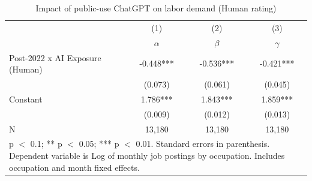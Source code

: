 \begin{table}[h]\centering
\def\sym#1{\ifmmode^{#1}\else\(^{#1}\)\fi}
\caption{Impact of public-use ChatGPT on labor demand (Human rating) \label{tab:did_postings_human}}
\begin{tabular}{l*{3}{c}}
\hline\hline
                    &\multicolumn{1}{c}{(1)}&\multicolumn{1}{c}{(2)}&\multicolumn{1}{c}{(3)}\\
                    &\multicolumn{1}{c}{$\alpha$}&\multicolumn{1}{c}{$\beta$}&\multicolumn{1}{c}{$\gamma$}\\
\hline
Post-2022 x AI Exposure (Human)&      -0.448***&      -0.536***&      -0.421***\\
                    &     (0.073)   &     (0.061)   &     (0.045)   \\
Constant            &       1.786***&       1.843***&       1.859***\\
                    &     (0.009)   &     (0.012)   &     (0.013)   \\
\hline
N                   &      13,180   &      13,180   &      13,180   \\
\hline\hline
\multicolumn{4}{p{0.7\linewidth}}{\footnotesize * p $<$ 0.1; ** p $<$ 0.05; *** p $<$ 0.01. Standard errors in parenthesis.          Dependent variable is Log of monthly job postings by occupation. Includes occupation and month fixed effects.}\\
\end{tabular}
\end{table}

